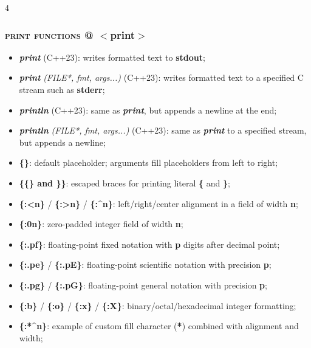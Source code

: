 \documentclass[10pt]{article}
\begin{document}
\begin{multicols*}{4}
{{\subsubsection*{\textsc{print functions} @ $<$print$>$} 
\begin{itemize}[leftmargin=*,topsep=0.25pt]
  \setlength\itemsep{-1.8pt}
  \item \emph{\textbf{print}} (C++23): writes formatted text to \textbf{stdout};
  \item \emph{\textbf{print}} \emph{(FILE*, fmt, args...)} (C++23): writes formatted text to a specified C stream such as \textbf{stderr};
  \item \emph{\textbf{println}} (C++23): same as \emph{\textbf{print}}, but appends a newline at the end;
  \item \emph{\textbf{println}} \emph{(FILE*, fmt, args...)} (C++23): same as \emph{\textbf{print}} to a specified stream, but appends a newline;
  \item \textbf{\{\}}: default placeholder; arguments fill placeholders from left to right;
  \item \textbf{\{\{\} and \}\}}: escaped braces for printing literal \textbf{\{} and \textbf{\}};
  \item \textbf{\{:<n\}} / \textbf{\{:>n\}} / \textbf{\{:\^{}n\}}: left/right/center alignment in a field of width \textbf{n};
  \item \textbf{\{:0n\}}: zero-padded integer field of width \textbf{n};
  \item \textbf{\{:.pf\}}: floating-point fixed notation with \textbf{p} digits after decimal point;
  \item \textbf{\{:.pe\}} / \textbf{\{:.pE\}}: floating-point scientific notation with precision \textbf{p};
  \item \textbf{\{:.pg\}} / \textbf{\{:.pG\}}: floating-point general notation with precision \textbf{p};
  \item \textbf{\{:b\}} / \textbf{\{:o\}} / \textbf{\{:x\}} / \textbf{\{:X\}}: binary/octal/hexadecimal integer formatting;
  \item \textbf{\{:*\^{}n\}}: example of custom fill character (\textbf{*}) combined with alignment and width;
\end{itemize}

}}
\end{multicols*}
\end{document}
